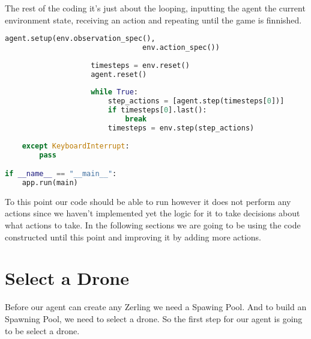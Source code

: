 \documentclass[11pt]{report}            %
\begin{document}
The rest of the coding it's just about the looping, inputting the agent the current environment state, receiving an action and repeating until the game is finnished.
\begin{lstlisting}[language=Python]
                    agent.setup(env.observation_spec(),
                                env.action_spec())
                
                    timesteps = env.reset()
                    agent.reset()
                
                    while True:
                        step_actions = [agent.step(timesteps[0])]
                        if timesteps[0].last():
                            break
                        timesteps = env.step(step_actions)
        
    except KeyboardInterrupt:
        pass

if __name__ == "__main__":
    app.run(main)
\end{lstlisting}
To this point our code should be able to run however it does not perform any actions since we haven't implemented yet the logic for it to take decisions about what actions to take. In the following sections we are going to be using the code constructed until this point and improving it by adding more actions.
\section{Select a Drone}
Before our agent can create any Zerling we need a Spawing Pool. And to build an Spawning Pool, we need to select a drone. So the first step for our agent is going to be select a drone.
\end{document}
